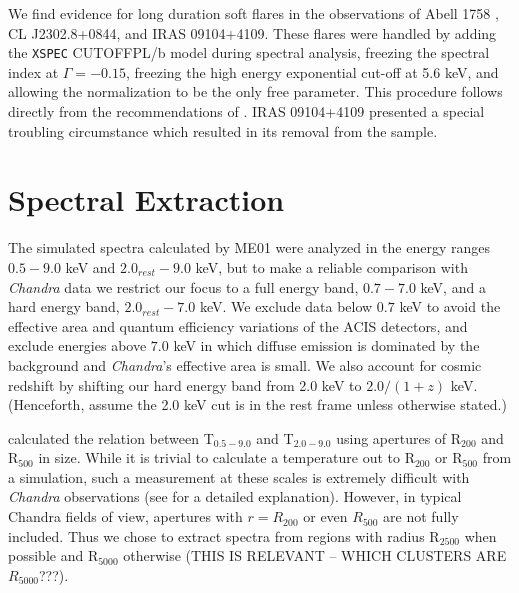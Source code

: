 \documentclass{emulateapj}
\begin{document}
{We find evidence for long duration soft flares in the
observations of Abell 1758 \citep{2004ApJ...613..831D}, CL
J2302.8+0844, and IRAS 09104+4109. These flares were handled
by adding the {\tt XSPEC} CUTOFFPL/b model during spectral analysis, freezing
the spectral index at $\Gamma=-0.15$, freezing the high energy
exponential cut-off at 5.6 keV, and allowing the normalization to be the
only free parameter. This procedure follows directly from the recommendations of
\cite{2003ApJ...583...70M}. IRAS 09104+4109 presented a special
troubling circumstance which resulted in its removal from the sample.

\section{Spectral Extraction} \label{sec:extraction}

The simulated spectra calculated by ME01 were analyzed in the energy ranges
$0.5-9.0$ keV and $2.0_{rest}-9.0$ keV, but to make a reliable comparison with
{\textit{Chandra}} data we restrict our focus to a full energy band, $0.7-7.0$ keV, and
a hard energy band, $2.0_{rest}-7.0$ keV. We exclude data below $0.7$ keV to avoid the
effective area and quantum efficiency variations of the ACIS detectors, and
exclude energies above $7.0$ keV in which diffuse emission is
dominated by the background and {\textit{Chandra}'s} effective area is
small. We also account for cosmic redshift by shifting our hard energy
band from 2.0 keV to $2.0/(1+z)$ keV. (Henceforth, assume the 2.0 keV
cut is in the rest frame unless otherwise stated.)

\cite{2001ApJ...546..100M} calculated the relation between
T$_{0.5-9.0}$ and T$_{2.0-9.0}$ using apertures of R$_{200}$ and
R$_{500}$ in size. While it is trivial to calculate a temperature out
to R$_{200}$ or R$_{500}$ from a simulation, such a measurement at
these scales is extremely difficult with {\textit{Chandra}}
observations (see \cite{2005ApJ...628..655V} for a detailed
explanation).  However, in typical Chandra fields of view, apertures with $r=R_{200}$ or
even $R_{500}$ are not fully included.
Thus we chose to extract spectra
from regions with radius R$_{2500}$ when possible and R$_{5000}$ otherwise 
(THIS IS RELEVANT -- WHICH CLUSTERS
ARE $ R_{5000}$???). 

}
\end{document}
